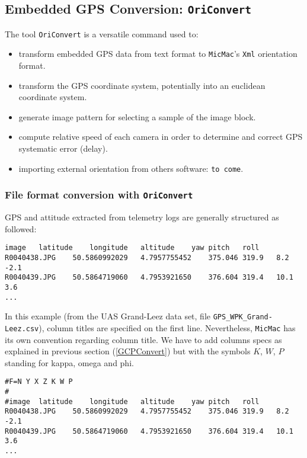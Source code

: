 \subsection{Embedded GPS Conversion: {\tt OriConvert}}\label{OriConvert}

The tool {\tt OriConvert} is a versatile command used to:
\begin{itemize}
\item transform embedded GPS data from text format to {\tt MicMac}'s {\tt Xml} orientation format.
\item transform the GPS coordinate system, potentially into an euclidean coordinate system.
\item generate image pattern for selecting a sample of the image block.
\item compute relative speed of each camera in order to determine and correct GPS systematic error (delay).
\item importing external orientation from others software: {\tt to come}.
\end{itemize}

\subsubsection{File format conversion with {\tt OriConvert}}

GPS and attitude extracted from telemetry logs are generally structured as followed:

\begin{verbatim}
image	latitude	longitude	altitude	yaw	pitch	roll
R0040438.JPG	50.5860992029	4.7957755452	375.046	319.9	8.2	-2.1
R0040439.JPG	50.5864719060	4.7953921650	376.604	319.4	10.1	3.6
...
\end{verbatim}


In this example (from the UAS Grand-Leez data set, file {\tt GPS\_WPK\_Grand-Leez.csv}), column titles are specified on the first line. Nevertheless, {\tt MicMac} has its own convention regarding column title. We have to add columns specs as explained in previous section (\ref{GCPConvert}) but with the symbols $K$, $W$, $P$ standing for kappa, omega and phi.

\begin{verbatim}
#F=N Y X Z K W P
#
#image	latitude	longitude	altitude	yaw	pitch	roll
R0040438.JPG	50.5860992029	4.7957755452	375.046	319.9	8.2	-2.1
R0040439.JPG	50.5864719060	4.7953921650	376.604	319.4	10.1	3.6
...
\end{verbatim}

